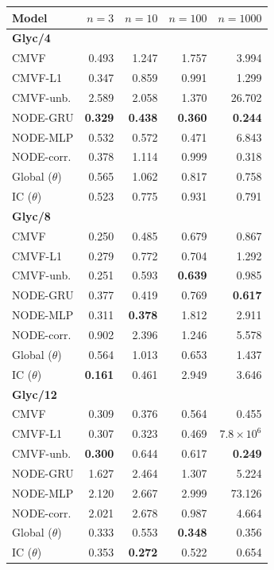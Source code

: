 \begin{tabular*}{\linewidth}{@{\extracolsep{\fill}}lrrrr}
\toprule
Model & $n=3$ & $n=10$ & $n=100$ & $n=1000$ \\
\midrule
\multicolumn{5}{l}{\textbf{Glyc/4}} \\
CMVF & 0.493 & 1.247 & 1.757 & 3.994 \\
CMVF-L1 & 0.347 & 0.859 & 0.991 & 1.299 \\
CMVF-unb. & 2.589 & 2.058 & 1.370 & 26.702 \\
NODE-GRU & \textbf{0.329} & \textbf{0.438} & \textbf{0.360} & \textbf{0.244} \\
NODE-MLP & 0.532 & 0.572 & 0.471 & 6.843 \\
NODE-corr. & 0.378 & 1.114 & 0.999 & 0.318 \\
Global ($\theta$) & 0.565 & 1.062 & 0.817 & 0.758 \\
IC ($\theta$) & 0.523 & 0.775 & 0.931 & 0.791 \\
\midrule
\multicolumn{5}{l}{\textbf{Glyc/8}} \\
CMVF & 0.250 & 0.485 & 0.679 & 0.867 \\
CMVF-L1 & 0.279 & 0.772 & 0.704 & 1.292 \\
CMVF-unb. & 0.251 & 0.593 & \textbf{0.639} & 0.985 \\
NODE-GRU & 0.377 & 0.419 & 0.769 & \textbf{0.617} \\
NODE-MLP & 0.311 & \textbf{0.378} & 1.812 & 2.911 \\
NODE-corr. & 0.902 & 2.396 & 1.246 & 5.578 \\
Global ($\theta$) & 0.564 & 1.013 & 0.653 & 1.437 \\
IC ($\theta$) & \textbf{0.161} & 0.461 & 2.949 & 3.646 \\
\midrule
\multicolumn{5}{l}{\textbf{Glyc/12}} \\
CMVF & 0.309 & 0.376 & 0.564 & 0.455 \\
CMVF-L1 & 0.307 & 0.323 & 0.469 & $7.8\!\times\!10^{6}$ \\
CMVF-unb. & \textbf{0.300} & 0.644 & 0.617 & \textbf{0.249} \\
NODE-GRU & 1.627 & 2.464 & 1.307 & 5.224 \\
NODE-MLP & 2.120 & 2.667 & 2.999 & 73.126 \\
NODE-corr. & 2.021 & 2.678 & 0.987 & 4.664 \\
Global ($\theta$) & 0.333 & 0.553 & \textbf{0.348} & 0.356 \\
IC ($\theta$) & 0.353 & \textbf{0.272} & 0.522 & 0.654 \\

\end{tabular*}
